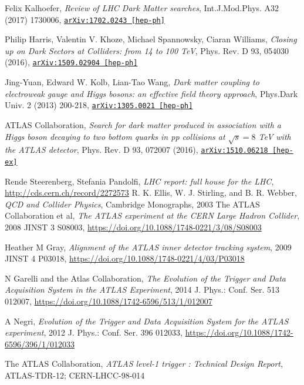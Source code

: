 \documentclass[12pt,a4paper,openright,twoside]{report}
\newcommand{\bibref}[4]{#1, \textit{#2}, #3 #4}
\begin{document}
\begin{thebibliography}{9}
	\bibref{Felix Kalhoefer}{Review of LHC Dark Matter searches}{Int.J.Mod.Phys. A32 (2017) 1730006,}{\href{https://arxiv.org/abs/1702.02430}{\texttt{arXiv:1702.0243 [hep-ph]}}}

	\bibref{Philip Harris, Valentin V. Khoze, Michael Spannowsky, Ciaran Williams}{Closing up on Dark Sectors at Colliders: from 14 to 100 TeV}{Phys. Rev. D 93, 054030 (2016),}{\href{https://arxiv.org/abs/1509.02904}{\texttt{arXiv:1509.02904 [hep-ph]}}}

	\bibref{Jing-Yuan, Edward W. Kolb, Lian-Tao Wang}{Dark matter coupling to electroweak gauge and Higgs bosons: an effective field theory approach}{Phys.Dark Univ. 2 (2013) 200-218,}{\href{https://arxiv.org/abs/1305.0021}{\texttt{arXiv:1305.0021 [hep-ph]}}}

	\bibref{ATLAS Collaboration}{Search for dark matter produced in association with a Higgs boson decaying to two bottom quarks in pp collisions at $\sqrt{s} = 8$ TeV with the ATLAS detector}{Phys. Rev. D 93, 072007 (2016),}{\href{https://arxiv.org/abs/1510.06218}{\texttt{arXiv:1510.06218 [hep-ex]}}}

	\bibref{Rende Steerenberg, Stefania Pandolfi}{LHC report: full house for the LHC}{ \url{http://cds.cern.ch/record/2272573}}
	
	\bibref{R. K. Ellis, W. J. Stirling, and B. R. Webber}{QCD and Collider Physics}{Cambridge Monographs, 2003}

	\bibref{The ATLAS Collaboration et al}{The ATLAS experiment at the CERN Large Hadron Collider}{2008 JINST 3 S08003,}{\url{https://doi.org/10.1088/1748-0221/3/08/S08003}}

	\bibref{Heather M Gray}{Alignment of the ATLAS inner detector tracking system}{2009 JINST 4 P03018,}{\url{https://doi.org/10.1088/1748-0221/4/03/P03018}}

	\bibref{N Garelli and the Atlas Collaboration}{The Evolution of the Trigger and Data Acquisition System in the ATLAS Experiment}{2014 J. Phys.: Conf. Ser. 513 012007,}{\url{https://doi.org/10.1088/1742-6596/513/1/012007}}

	\bibref{A Negri}{Evolution of the Trigger and Data Acquisition System for the ATLAS experiment}{2012 J. Phys.: Conf. Ser. 396 012033,}{\url{https://doi.org/10.1088/1742-6596/396/1/012033}}

	\bibref{The ATLAS Collaboration}{ATLAS level-1 trigger : Technical Design Report}{ATLAS-TDR-12;}{CERN-LHCC-98-014}


\end{thebibliography}
\end{document}
